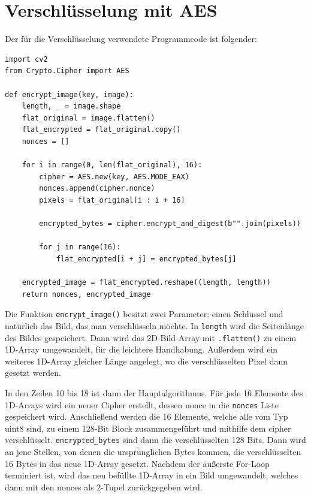 \section{Verschlüsselung mit AES}
Der für die Verschlüsselung verwendete Programmcode ist folgender:
\begin{lstlisting}
import cv2
from Crypto.Cipher import AES

def encrypt_image(key, image):
    length, _ = image.shape
    flat_original = image.flatten()
    flat_encrypted = flat_original.copy()
    nonces = []

    for i in range(0, len(flat_original), 16):
        cipher = AES.new(key, AES.MODE_EAX)
        nonces.append(cipher.nonce)
        pixels = flat_original[i : i + 16]

        encrypted_bytes = cipher.encrypt_and_digest(b"".join(pixels))

        for j in range(16):
            flat_encrypted[i + j] = encrypted_bytes[j]

    encrypted_image = flat_encrypted.reshape((length, length))
    return nonces, encrypted_image

\end{lstlisting}
Die Funktion \lstinline{encrypt_image()} besitzt zwei Parameter: einen Schlüssel und natürlich das Bild,
das man verschlüsseln möchte. In \lstinline{length} wird die Seitenlänge des Bildes gespeichert. Dann wird das 2D-Bild-Array
mit \lstinline{.flatten()} zu einem 1D-Array umgewandelt, für die leichtere Handhabung. Außerdem wird ein weiteres 1D-Array
gleicher Länge angelegt, wo die verschlüsselten Pixel dann gesetzt werden.

In den Zeilen 10 bis 18 ist dann der Hauptalgorithmus. Für jede 16 Elemente des 1D-Arrays wird ein neuer Cipher erstellt,
dessen nonce in die \lstinline{nonces} Liste gespeichert wird. Anschließend werden die 16 Elemente, welche alle vom Typ uint8
sind, zu einem 128-Bit Block zusammengeführt und mithilfe dem cipher verschlüsselt. \lstinline{encrypted_bytes} sind dann
die verschlüsselten 128 Bits. Dann wird an jene Stellen, von denen die ursprünglichen Bytes kommen, die verschlüsselten
16 Bytes in das neue 1D-Array gesetzt. Nachdem der äußerste For-Loop terminiert ist, wird das neu befüllte 1D-Array in ein
Bild umgewandelt, welches dann mit den nonces als 2-Tupel zurückgegeben wird.

